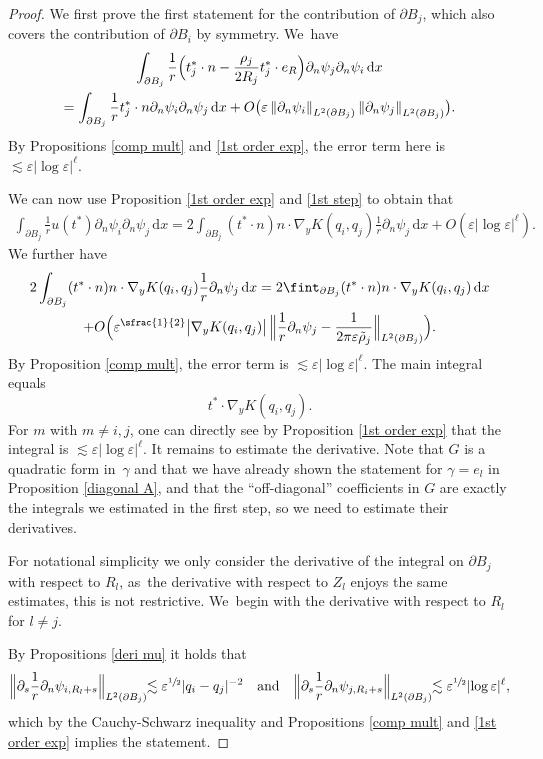 \documentclass[10pt]{amsart}
\let\strokedint\fint
\let\epsilon\varepsilon
\theoremstyle{definition}
\newcommand\norm[1]{\left\lVert #1\right\rVert}
\newcommand\Bnorm[1]{\Bigl\lVert #1\Bigr\rVert}
\newcommand\eq{=}
\newcommand\dd{\,\mathrm{d}}
\newcommand\dx{\dd x}
\let\de\partial
\let\eps\epsilon
\begin{document}
\begin{proof}
We first prove the first statement for the contribution of $\de B_j$, which also covers the contribution of $\de B_i$ by symmetry. We~have
\begin{multline}\label{1st step}
\int_{\de B_j}\frac{1}{r}\Bigl(t_j^*\cdot n-\frac{\rho_j}{2R_j}t_j^*\cdot e_R\Bigr)\de_n\psi_j\de_n\psi_i\dx\\
\eq \int_{\de B_j} \frac{1}{r}t_j^*\cdot n\de_n \psi_i\de_n\psi_j\dx+O\bigl(\eps\norm{\de_n\psi_i}_{L^2(\de B_j)}\norm{\de_n\psi_j}_{L^2(\de B_j)}\bigr).
\end{multline}
By Propositions \ref{comp mult} and \ref{1st order exp}, the error term here is $\lesssim \eps|{\log\eps}|^\ell$.

We can now use Proposition \ref{1st order exp} and \eqref{1st step} to obtain that
\begin{align*}
\int_{\de B_j}\frac{1}{r}u(t^*)\de_n\psi_i\de_n\psi_j\dx\eq 2\int_{\de B_j}(t^*\cdot n)n\cdot\nabla_yK(q_i,q_j)\frac{1}{r}\de_n\psi_j\dx+O\left(\eps|{\log\eps}|^\ell\right).
\end{align*}
We further have
\begin{multline*}
2\int_{\de B_j}(t^*\cdot n)n\cdot\nabla_yK(q_i,q_j)\frac{1}{r}\de_n\psi_j\dx\eq2\strokedint_{\de B_j} (t^*\cdot n)n\cdot\nabla_yK(q_i,q_j)\dx\\
+O\Bigl(\eps^{\sfrac{1}{2}}\bigl|\nabla_yK(q_i,q_j)\bigr|\,\Bnorm{\frac{1}{r}\de_n\psi_j-\frac{1}{2\pi\eps\tilde{\rho}_j}}_{L^2(\de B_j)}\Bigr).
\end{multline*}
By Proposition \ref{comp mult}, the error term is $\lesssim \eps|{\log\eps}|^\ell$. The main integral equals
\[
t^*\cdot\nabla_yK(q_i,q_j).
\]
For $m$ with $m\neq i,j$, one can directly see by Proposition \ref{1st order exp} that the integral is $\lesssim \eps|{\log\eps}|^\ell$.
It remains to estimate the derivative. Note that $G$ is a quadratic form in~$\gamma$ and that we have already shown the statement for $\gamma=e_l$ in Proposition \ref{diagonal A}, and that the ``off-diagonal'' coefficients in $G$ are exactly the integrals we estimated in the first step, so we need to estimate their derivatives.

For notational simplicity we only consider the derivative of the integral on $\de B_j$ with respect to $R_l$, as~the derivative with respect to $Z_l$ enjoys the same estimates, this is not restrictive. We~begin with the derivative with respect to $R_l$ for $l\neq j$.

By Propositions \ref{deri mu} it holds that
\begin{align*}
\Bnorm{\de_s\frac{1}{r}\de_n\psi_{i,R_l+s}}_{L^2(\de B_j)}\!\!\lesssim \eps^{\sfrac{1}{2}}|q_i-q_j|^{-2}\quad\text{and}\quad \Bnorm{\de_s\frac{1}{r}\de_n\psi_{j,R_i+s}}_{L^2(\de B_j)}\!\!\lesssim \eps^{\sfrac{1}{2}}|{\log\eps}|^\ell,
\end{align*}
which by the Cauchy-Schwarz inequality and Propositions \ref{comp mult} and \ref{1st order exp} implies the statement.


\end{proof}
\end{document}
